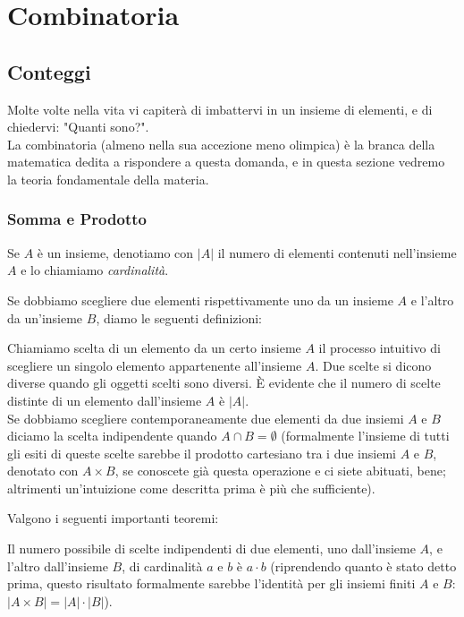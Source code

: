 \documentclass[11pt]{scrartcl}
\begin{document}
	\section{Combinatoria}
	
	\subsection{Conteggi}
	Molte volte nella vita vi capiterà di imbattervi in un insieme di elementi, e di chiedervi: "Quanti sono?".\\
	La combinatoria (almeno nella sua accezione meno olimpica) è la branca della matematica dedita a rispondere a questa domanda, e in questa sezione vedremo la teoria fondamentale della materia.
	
	\subsubsection{Somma e Prodotto}
	\begin{definition}
		Se $A$ è un insieme, denotiamo con $|A|$ il numero di elementi contenuti nell'insieme $A$ e lo chiamiamo \textit{cardinalità}.
	\end{definition}
	Se dobbiamo scegliere due elementi rispettivamente uno da un insieme $A$ e l'altro da un'insieme $B$, diamo le seguenti definizioni:
	\begin{definition}
		Chiamiamo scelta di un elemento da un certo insieme $A$ il processo intuitivo di scegliere un singolo elemento appartenente all'insieme $A$. Due scelte si dicono diverse quando gli oggetti scelti sono diversi. È evidente che il numero di scelte distinte di un elemento dall'insieme $A$ è $|A|$.\\
		Se dobbiamo scegliere contemporaneamente due elementi da due insiemi $A$ e $B$ diciamo la scelta indipendente quando $A \cap B = \emptyset$ (formalmente l'insieme di tutti gli esiti di queste scelte sarebbe il prodotto cartesiano tra i due insiemi $A$ e $B$, denotato con $A \times B$, se conoscete già questa operazione e ci siete abituati, bene; altrimenti un'intuizione come descritta prima è più che sufficiente).
	\end{definition}
	Valgono i seguenti importanti teoremi:
	\begin{theorem}
		\label{C:prod}
		Il numero possibile di scelte indipendenti di due elementi, uno dall'insieme $A$, e l'altro dall'insieme $B$, di cardinalità $a$ e $b$ è $a \cdot b$ (riprendendo quanto è stato detto prima, questo risultato formalmente sarebbe l'identità per gli insiemi finiti $A$ e $B$: $|A\times B|=|A|\cdot|B|$).
	\end{theorem}
\end{document}
